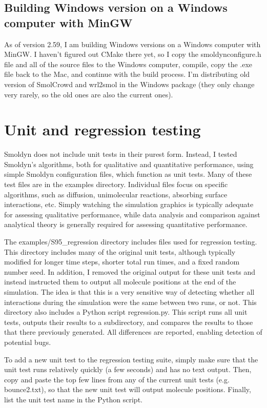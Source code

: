 \documentclass {book}
\begin{document}
\subsection{Building Windows version on a Windows computer with MinGW}

As of version 2.59, I am building Windows versions on a Windows computer with MinGW. I haven't figured out CMake there yet, so I copy the smoldynconfigure.h file and all of the source files to the Windows computer, compile, copy the .exe file back to the Mac, and continue with the build process. I'm distributing old version of SmolCrowd and wrl2smol in the Windows package (they only change very rarely, so the old ones are also the current ones).

\section{Unit and regression testing}

Smoldyn does not include unit tests in their purest form. Instead, I tested Smoldyn's algorithms, both for qualitative and quantitative performance, using simple Smoldyn configuration files, which function as unit tests. Many of these test files are in the examples directory. Individual files focus on specific algorithms, such as diffusion, unimolecular reactions, absorbing surface interactions, etc. Simply watching the simulation graphics is typically adequate for assessing qualitative performance, while data analysis and comparison against analytical theory is generally required for assessing quantitative performance.

The examples/S95\_regression directory includes files used for regression testing. This directory includes many of the original unit tests, although typically modified for longer time steps, shorter total run times, and a fixed random number seed. In addition, I removed the original output for these unit tests and instead instructed them to output all molecule positions at the end of the simulation. The idea is that this is a very sensitive way of detecting whether all interactions during the simulation were the same between two runs, or not. This directory also includes a Python script regression.py. This script runs all unit tests, outputs their results to a subdirectory, and compares the results to those that there previously generated. All differences are reported, enabling detection of potential bugs.

To add a new unit test to the regression testing suite, simply make sure that the unit test runs relatively quickly (a few seconds) and has no text output. Then, copy and paste the top few lines from any of the current unit tests (e.g. bounce2.txt), so that the new unit test will output molecule positions. Finally, list the unit test name in the Python script.
\end{document}
